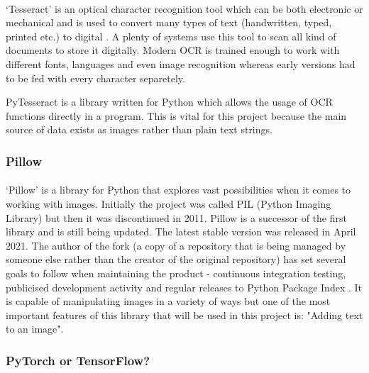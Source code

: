 \documentclass[12pt]{report}
\begin{document}
    \paragraph{}

    `Tesseract' is an optical character recognition tool which can be both electronic or mechanical and is used to convert many types of text (handwritten, typed, printed etc.) to digital \citep{tesseract_article}. A plenty of systems use this tool to scan all kind of documents to store it digitally.
    Modern OCR is trained enough to work with different fonts, languages and even image recognition whereas early versions had to be fed with every character separetely.

    PyTesseract is a library written for Python which allows the usage of OCR functions directly in a program. This is vital for this project because the main source of data exists as images rather than plain text strings.

    \subsubsection{Pillow}
    \paragraph{}

    `Pillow' is a library for Python that explores vast possibilities when it comes to working with images. Initially the project was called PIL (Python Imaging Library) but then it was discontinued in 2011.
    Pillow is a successor of the first library and is still being updated. The latest stable version was released in April 2021. The author of the fork (a copy of a repository that is being managed by someone else rather than the creator of the original repository) has set several goals to follow when maintaining the product - continuous integration testing, publicised development activity and regular releases to Python Package Index \citep{pillow_about}. 
    It is capable of manipulating images in a variety of ways but one of the most important features of this library that will be used in this project is: "Adding text to an image".

    \subsubsection*{PyTorch or TensorFlow?}
\end{document}
